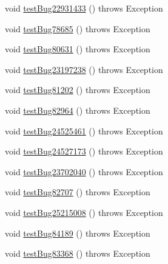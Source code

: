 \begin{DoxyCompactItemize}
\item 
void \mbox{\hyperlink{classtestsuite_1_1regression_1_1_result_set_regression_test_a4280c4f75edf35720e0d0c71a78dfc3b}{test\+Bug22931433}} ()  throws Exception 
\item 
void \mbox{\hyperlink{classtestsuite_1_1regression_1_1_result_set_regression_test_a438ea870d217dc3c5a0df443b040c99f}{test\+Bug78685}} ()  throws Exception 
\item 
void \mbox{\hyperlink{classtestsuite_1_1regression_1_1_result_set_regression_test_a6e1a80555921fe0d80bc15731cb1d63d}{test\+Bug80631}} ()  throws Exception 
\item 
void \mbox{\hyperlink{classtestsuite_1_1regression_1_1_result_set_regression_test_ac1e7b24d29571cdb490adf701dafaf34}{test\+Bug23197238}} ()  throws Exception 
\item 
void \mbox{\hyperlink{classtestsuite_1_1regression_1_1_result_set_regression_test_aed8cd6b2bbcd1c46e0dc18214e1b59da}{test\+Bug81202}} ()  throws Exception 
\item 
void \mbox{\hyperlink{classtestsuite_1_1regression_1_1_result_set_regression_test_ace4a217898fd277518ec5825825afff7}{test\+Bug82964}} ()  throws Exception 
\item 
void \mbox{\hyperlink{classtestsuite_1_1regression_1_1_result_set_regression_test_a448319c15d5ce9214d504185c6c3db4b}{test\+Bug24525461}} ()  throws Exception 
\item 
void \mbox{\hyperlink{classtestsuite_1_1regression_1_1_result_set_regression_test_a7f1e4ac0d4e590dbb25dea141a8145a8}{test\+Bug24527173}} ()  throws Exception 
\item 
void \mbox{\hyperlink{classtestsuite_1_1regression_1_1_result_set_regression_test_aeea941d7e449375b72a8322fc87a9b06}{test\+Bug23702040}} ()  throws Exception 
\item 
void \mbox{\hyperlink{classtestsuite_1_1regression_1_1_result_set_regression_test_a688d90e50548f04a0b619036771f036b}{test\+Bug82707}} ()  throws Exception 
\item 
void \mbox{\hyperlink{classtestsuite_1_1regression_1_1_result_set_regression_test_a907253b61a654aa59201c64918221977}{test\+Bug25215008}} ()  throws Exception 
\item 
void \mbox{\hyperlink{classtestsuite_1_1regression_1_1_result_set_regression_test_af965cfa28edc223aede9f2583526cc38}{test\+Bug84189}} ()  throws Exception 
\item 
void \mbox{\hyperlink{classtestsuite_1_1regression_1_1_result_set_regression_test_a863a946bd6da03a3bdf873749470d8ff}{test\+Bug83368}} ()  throws Exception 

\end{DoxyCompactItemize}
